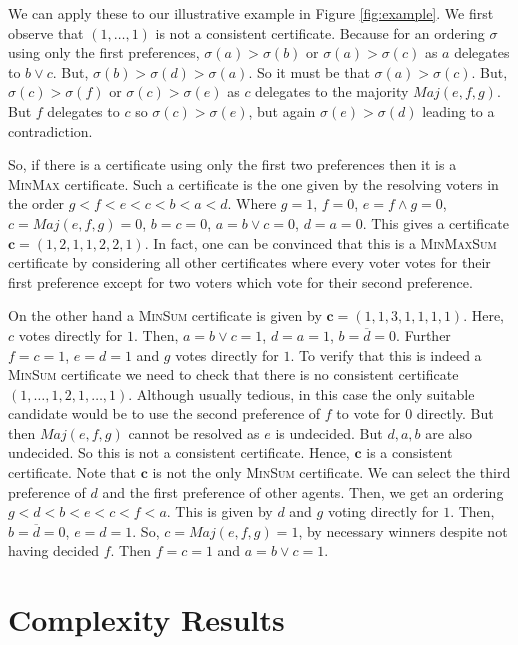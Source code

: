 \documentclass[11pt,a4paper, titlepage]{article}
\theoremstyle{definition}
\let\vec\mathbf
\newcommand{\Maj}{\mathit{Maj}}
\begin{document}
We can apply these to our illustrative example in Figure \ref{fig:example}. We first observe that $(1, \ldots, 1)$ is not a consistent certificate. Because for an ordering $\sigma$ using only the first preferences, $\sigma(a) > \sigma(b)$ or $\sigma(a) > \sigma(c)$ as $a$ delegates to $b \lor c$. But, $\sigma(b) > \sigma(d) > \sigma(a)$. So it must be that $\sigma(a) > \sigma(c)$. But, $\sigma(c) > \sigma(f)$ or $\sigma(c) > \sigma(e)$ as $c$ delegates to the majority $\Maj(e, f, g)$. 
But $f$ delegates to $c$ so $\sigma(c) > \sigma(e)$, but again $\sigma(e) > \sigma(d)$ leading to a contradiction.

So, if there is a certificate using only the first two preferences then it is a \textsc{MinMax} certificate. 
Such a certificate is the one given by the resolving voters in the order $g < f < e < c < b < a < d$.
Where $g = 1$, $f = 0$, $e = f \land g = 0$, $c = Maj(e, f, g) = 0$, $b = c = 0$, $a = b \lor c = 0$, $d = a = 0$. This gives a certificate $\vec{c} = (1, 2, 1, 1, 2, 2, 1)$.
In fact, one can be convinced that this is a \textsc{MinMaxSum} certificate by considering all other certificates where every voter votes for their first preference except for two voters which vote for their second preference.

On the other hand a \textsc{MinSum} certificate is given by $\vec{c} = (1, 1, 3, 1, 1, 1, 1)$.
Here, $c$ votes directly for $1$. Then, $a = b \lor c = 1$, $d = a = 1$, $b = \overline{d} = 0$. Further $f = c = 1$, $e = d = 1$ and $g$ votes directly for $1$.
To verify that this is indeed a \textsc{MinSum} certificate we need to check that there is no consistent certificate $(1, \ldots, 1, 2, 1, \ldots, 1)$.
Although usually tedious, in this case the only suitable candidate would be to use the second preference of $f$ to vote for $0$ directly. But then $\Maj(e, f, g)$ cannot be resolved as $e$ is undecided. But $d, a, b$ are also undecided. So this is not a consistent certificate.
Hence, $\vec{c}$ is a consistent certificate.
Note that $\vec{c}$ is not the only \textsc{MinSum} certificate. We can select the third preference of $d$ and the first preference of other agents.
Then, we get an ordering $g < d < b < e < c < f < a$.
This is given by $d$ and $g$ voting directly for $1$.
Then, $b = \overline{d} = 0$, $e = d = 1$. So, $c = \Maj(e, f, g) = 1$, by necessary winners despite not having decided $f$. Then $f = c = 1$ and $a = b \lor c = 1$.

\newpage



\section{Complexity Results}
\label{section:Complexity}
\end{document}
